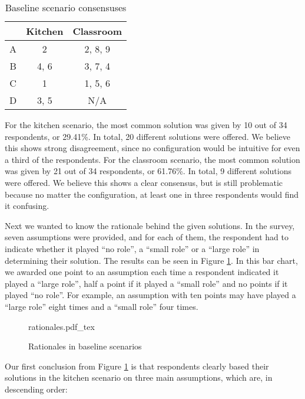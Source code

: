 \begin{table}
    \centering
    \begin{tabular}{|c|c|c|} 
    \hline
      & Kitchen & Classroom \\
    \hline
    A & 2       & 2, 8, 9   \\
    B & 4, 6    & 3, 7, 4   \\
    C & 1       & 1, 5, 6   \\
    D & 3, 5    & N/A       \\
    \hline
\end{tabular}
\caption{Baseline scenario consensuses}
\label{table:preliminary_study_consensus}
\end{table}

For the kitchen scenario, the most common solution was given by 10 out of 34 respondents, or 29.41\%. In total, 20 different solutions were offered. We believe this shows strong disagreement, since no configuration would be intuitive for even a third of the respondents. For the classroom scenario, the most common solution was given by 21 out of 34 respondents, or 61.76\%. In total, 9 different solutions were offered. We believe this shows a clear consensus, but is still problematic because no matter the configuration, at least one in three respondents would find it confusing.

Next we wanted to know the rationale behind the given solutions. In the survey, seven assumptions were provided, and for each of them, the respondent had to indicate whether it played ``no role'', a ``small role'' or a ``large role'' in determining their solution. The results can be seen in Figure \ref{fig:preliminary_study_rationales}. In this bar chart, we awarded one point to an assumption each time a respondent indicated it played a ``large role'', half a point if it played a ``small role'' and no points if it played ``no role''. For example, an assumption with ten points may have played a ``large role'' eight times and a ``small role'' four times.

\begin{figure}
    \centering
    \def\svgwidth{\columnwidth}
    {rationales.pdf_tex}
    \caption{Rationales in baseline scenarios}
    \label{fig:preliminary_study_rationales}
\end{figure}

Our first conclusion from Figure \ref{fig:preliminary_study_rationales} is that respondents clearly based their solutions in the kitchen scenario on three main assumptions, which are, in descending order:


